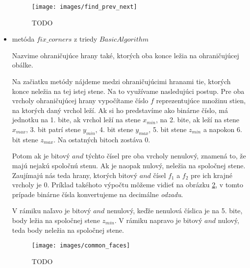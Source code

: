 \begin{itemize}
{                \begin{figure}
                    \centerline{\texttt{[image: images/find\_prev\_next]}}
                    \caption[TODO]{TODO}
                    \label{obr:find_prev_next}
                \end{figure}
    }
    \item{
        metóda $fix\_corners$ z triedy $BasicAlgorithm$

        Nazvime ohraničujúce hrany také, ktorých oba konce ležia na ohraničujúcej obálke.
                
                Na začiatku metódy nájdeme medzi ohraničujúcimi hranami tie, ktorých konce neležia
                na tej istej stene. Na to využívame nasledujúci postup. Pre oba vrcholy ohraničujúcej 
                hrany vypočítame číslo $f$ reprezentujúce množinu stien, na ktorých daný vrchol leží. 
                Ak si ho predstavíme ako binárne číslo, má jednotku na 1. bite, ak vrchol leží na stene 
                $x_{min}$, na 2. bite, ak leží na stene $x_{max}$, 3. bit patrí stene $y_{min}$, 4. bit
                stene $y_{max}$, 5. bit stene $z_{min}$ a napokon 6. bit stene $z_{max}$. Na ostatných 
                bitoch zostáva 0. 
                
                Potom ak je bitový $and$ týchto čísel pre oba vrcholy nenulový, znamená
                to, že majú nejakú spoločnú stenu. Ak je naopak nulový, neležia na spoločnej stene.
                Zaujímajú nás teda hrany, ktorých bitový $and$ čísel $f_1$ a $f_2$ pre ich krajné 
                vrcholy je 0. Príklad takéhoto výpočtu môžeme vidieť na obrázku \ref{obr:common_faces}, 
                v tomto prípade binárne čísla konvertujeme na decimálne \textit{odzadu}.

                V rámiku naľavo je bitový $and$ nenulový, keďže nenulová číslica je na 5. bite, body ležia
                na spoločnej stene $z_{min}$. V rámiku napravo je bitový $and$ nulový, teda body neležia
                na spoločnej stene.

                \begin{figure}
                    \centerline{\texttt{[image: images/common\_faces]}}
                    \caption[TODO]{TODO}
                    \label{obr:common_faces}
                \end{figure}

}
\end{itemize}
